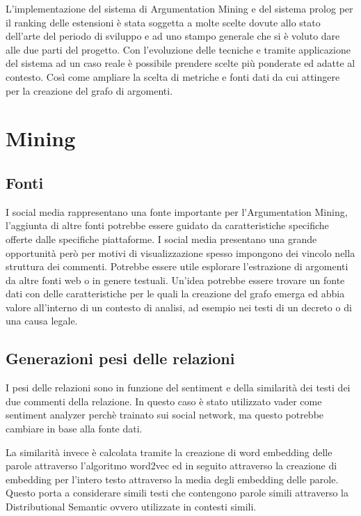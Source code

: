 


L'implementazione del sistema di Argumentation Mining e del sistema prolog per il ranking delle estensioni è stata soggetta a molte scelte dovute allo stato dell'arte del periodo di sviluppo e ad uno stampo generale che si è voluto dare alle due parti del progetto. Con l'evoluzione delle tecniche e tramite applicazione del sistema ad un caso reale è possibile prendere scelte più ponderate ed adatte al contesto. Così come ampliare la scelta di metriche e fonti dati da cui attingere per la creazione del grafo di argomenti.


\section{Mining}
\label{section:ranking}

\subsection {Fonti} 
I social media rappresentano una fonte importante per l'Argumentation Mining, l'aggiunta di altre fonti potrebbe essere guidato da caratteristiche specifiche offerte dalle specifiche piattaforme. I social media presentano una grande opportunità però per motivi di visualizzazione spesso impongono dei vincolo nella struttura dei commenti. Potrebbe essere utile esplorare l'estrazione di argomenti da altre fonti web o in genere testuali. Un'idea potrebbe essere trovare un fonte dati con delle caratteristiche per le quali la creazione del grafo emerga ed abbia valore all'interno di un contesto di analisi, ad esempio nei testi di un decreto o di una causa legale.

\subsection {Generazioni pesi delle relazioni} 
I pesi delle relazioni sono in funzione del sentiment e della similarità dei testi dei due commenti della relazione. In questo caso è stato utilizzato vader \cite{hutto2014vader} come sentiment analyzer perchè trainato sui social network, ma questo potrebbe cambiare in base alla fonte dati.

La similarità invece è calcolata tramite la creazione di word embedding delle parole attraverso l'algoritmo word2vec \cite{} ed in seguito attraverso la creazione di embedding per l'intero testo attraverso la media degli embedding delle parole. Questo porta a considerare simili testi che contengono parole simili attraverso la Distributional Semantic ovvero utilizzate in contesti simili.

